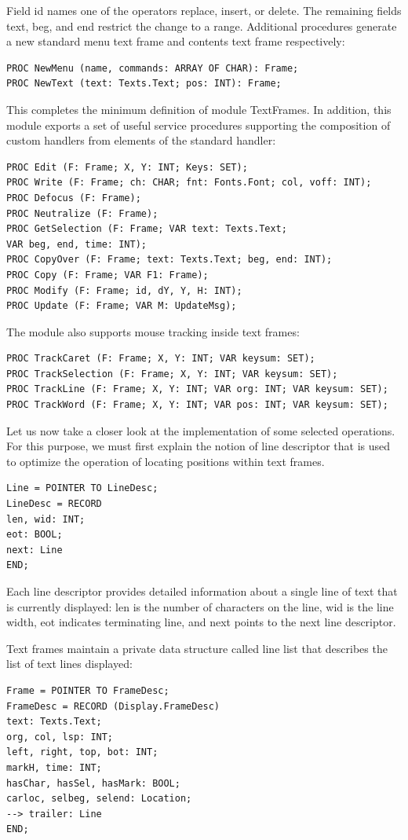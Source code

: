 Field id names one of the operators replace, insert, or delete. The remaining fields text, beg, and
end restrict the change to a range. Additional procedures generate a new standard menu text frame
and contents text frame respectively:
\begin{verbatim}
PROC NewMenu (name, commands: ARRAY OF CHAR): Frame;
PROC NewText (text: Texts.Text; pos: INT): Frame;
\end{verbatim}

This completes the minimum definition of module TextFrames. In addition, this module exports a
set of useful service procedures supporting the composition of custom handlers from elements of
the standard handler:
\begin{verbatim}
PROC Edit (F: Frame; X, Y: INT; Keys: SET);
PROC Write (F: Frame; ch: CHAR; fnt: Fonts.Font; col, voff: INT);
PROC Defocus (F: Frame);
PROC Neutralize (F: Frame);
PROC GetSelection (F: Frame; VAR text: Texts.Text;
VAR beg, end, time: INT);
PROC CopyOver (F: Frame; text: Texts.Text; beg, end: INT);
PROC Copy (F: Frame; VAR F1: Frame);
PROC Modify (F: Frame; id, dY, Y, H: INT);
PROC Update (F: Frame; VAR M: UpdateMsg);
\end{verbatim}

The module also supports mouse tracking inside text frames:
\begin{verbatim}
PROC TrackCaret (F: Frame; X, Y: INT; VAR keysum: SET);
PROC TrackSelection (F: Frame; X, Y: INT; VAR keysum: SET);
PROC TrackLine (F: Frame; X, Y: INT; VAR org: INT; VAR keysum: SET);
PROC TrackWord (F: Frame; X, Y: INT; VAR pos: INT; VAR keysum: SET);
\end{verbatim}

Let us now take a closer look at the implementation of some selected operations. For this purpose,
we must first explain the notion of line descriptor that is used to optimize the operation of locating
positions within text frames.
\begin{verbatim}
Line = POINTER TO LineDesc;
LineDesc = RECORD
len, wid: INT;
eot: BOOL;
next: Line
END;
\end{verbatim}

Each line descriptor provides detailed information about a single line of text that is currently
displayed: len is the number of characters on the line, wid is the line width, eot indicates
terminating line, and next points to the next line descriptor.

Text frames maintain a private data structure called line list that describes the list of text lines
displayed:
\begin{verbatim}
Frame = POINTER TO FrameDesc;
FrameDesc = RECORD (Display.FrameDesc)
text: Texts.Text;
org, col, lsp: INT;
left, right, top, bot: INT;
markH, time: INT;
hasChar, hasSel, hasMark: BOOL;
carloc, selbeg, selend: Location;
--> trailer: Line
END;
\end{verbatim}


